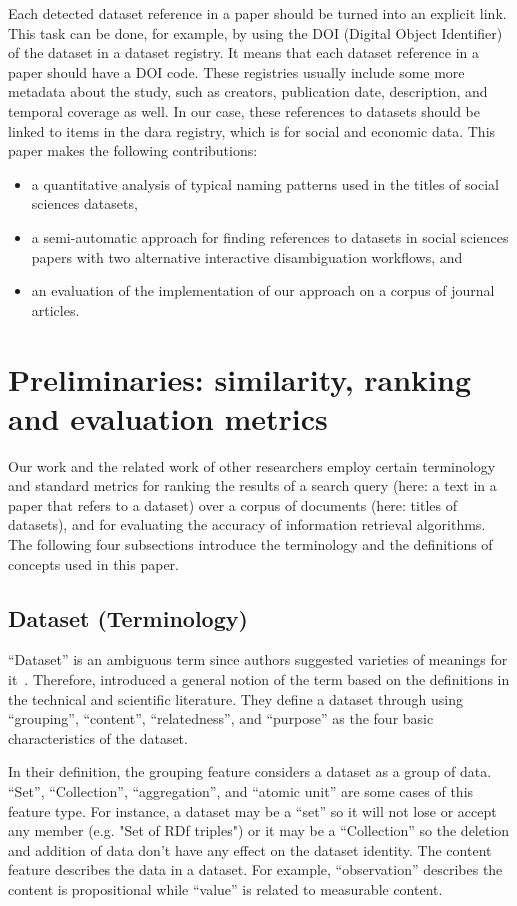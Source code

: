 \documentclass{IOS-Book-Article}
\newcommand{\dara}{\textsf{da\textbar ra}}
\begin{document}
Each detected dataset reference in a paper should be turned into an explicit link. This task can be done, for example, by using the DOI (Digital Object Identifier) of the dataset in a dataset registry. It means that each dataset reference in a paper should have a DOI code. These registries usually include some more metadata about the study, such as creators, publication date, description, and temporal coverage as well. In our case, these references to datasets should be linked to items in the {\dara} registry, which is for social and economic data. This paper makes the following contributions:
\begin{itemize}
\item a quantitative analysis of typical naming patterns used in the titles of social sciences datasets,
\item a semi-automatic approach for finding references to datasets in social sciences papers with two alternative interactive disambiguation workflows, and
\item an evaluation of the implementation of our approach on a corpus of journal articles.  
\end{itemize}

\section{Preliminaries: similarity, ranking and evaluation metrics}
\label{sec:preliminaries}
Our work and the related work of other researchers employ certain terminology and standard metrics for ranking the results of a search query (here: a text in a paper that refers to a dataset) over a corpus of documents (here: titles of datasets), and for evaluating the accuracy of information retrieval algorithms.
The following four subsections introduce the terminology and the definitions of concepts used in this paper.
\subsection{Dataset (Terminology)}
\enquote{Dataset} is an ambiguous term since authors suggested varieties of meanings for it~\cite{peplerpreservation}.
Therefore, \citeauthor{renear2010definitions} introduced a general notion of the term based on the definitions in the technical and scientific literature.
They define a dataset through using \enquote{grouping}, \enquote{content}, \enquote{relatedness}, and \enquote{purpose} as the four basic characteristics of the dataset.

In their definition, the grouping feature considers a dataset as a group of data.  \enquote{Set}, \enquote{Collection}, \enquote{aggregation}, and \enquote{atomic unit} are some cases of this feature type. For instance, a dataset may be a \enquote{set} so it will not lose or accept any member (e.g. "Set of RDf triples")\cite{renear2010definitions} or it may be a \enquote{Collection} so the deletion and addition of data don't have any effect on the dataset identity. The content feature describes the data in a dataset. For example, \enquote{observation} describes the content is propositional while \enquote{value} is related to measurable content.
\end{document}
